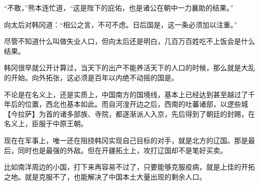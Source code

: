 “不敢，”熊本连忙道，“这是陛下的庇佑，也是诸公在朝中一力襄助的结果。”

向太后对韩冈道：“相公之言，不可不虑。日后国是，这一条必须加以注重。”

尽管不知道什么叫做失业人口，但向太后还是明白，几百万百姓吃不上饭会是什么结果。

韩冈很早就公开计算过，当天下的出产不能养活天下的人口的时候，那么就是大乱的开始。向外拓张，这必须是百年以内绝不动摇的国是。

不论是在名义上，还是实质上，中国南方的国境线，基本上已经达到甚至越过了千年后的位置，西北也基本如此。而自河湟开边之后，西南的吐蕃诸部，以逻些城【今拉萨】为首的诸多部族、寺院，都逐渐派人入京，先后得到了朝廷的封赐，在名义上，臣服于中原王朝。

现在在军事上，唯一还在阻挠韩冈实现自己目标的对手，就是北方的辽国。那是最后，同时也是最强的外敌。但在开疆拓土上，攻打辽国却不是笔好买卖。

比如南洋周边的小国，打下来再容易不过了，只要能够克服疫病，就是上佳的开拓之地。就是克服不了，也能解决了中国本土大量出现的剩余人口。
